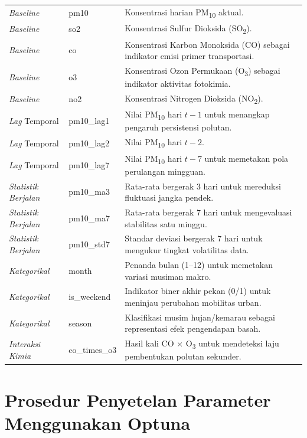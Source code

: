 \begin{longtable}{>{\raggedright\arraybackslash}p{2.5cm}
                  >{\raggedright\arraybackslash}p{2.3cm}
                  >{\raggedright\arraybackslash}p{8.1cm}}
\textit{Baseline} & pm10 & Konsentrasi harian PM\textsubscript{10} aktual. \\
\textit{Baseline} & so2 & Konsentrasi Sulfur Dioksida (SO\textsubscript{2}). \\
\textit{Baseline} & co & Konsentrasi Karbon Monoksida (CO) sebagai indikator emisi primer transportasi. \\
\textit{Baseline} & o3 & Konsentrasi Ozon Permukaan (O\textsubscript{3}) sebagai indikator aktivitas fotokimia. \\
\textit{Baseline} & no2 & Konsentrasi Nitrogen Dioksida (NO\textsubscript{2}). \\
\textit{Lag} Temporal & pm10\_lag1 & Nilai PM\textsubscript{10} hari $t-1$ untuk menangkap pengaruh persistensi polutan. \\
\textit{Lag} Temporal & pm10\_lag2 & Nilai PM\textsubscript{10} hari $t-2$. \\
\textit{Lag} Temporal & pm10\_lag7 & Nilai PM\textsubscript{10} hari $t-7$ untuk memetakan pola perulangan mingguan. \\
\textit{Statistik Berjalan} & pm10\_ma3 & Rata-rata bergerak 3 hari untuk mereduksi fluktuasi jangka pendek. \\
\textit{Statistik Berjalan} & pm10\_ma7 & Rata-rata bergerak 7 hari untuk mengevaluasi stabilitas satu minggu. \\
\textit{Statistik Berjalan} & pm10\_std7 & Standar deviasi bergerak 7 hari untuk mengukur tingkat volatilitas data. \\
\textit{Kategorikal} & month & Penanda bulan (1--12) untuk memetakan variasi musiman makro. \\
\textit{Kategorikal} & is\_weekend & Indikator biner akhir pekan (0/1) untuk meninjau perubahan mobilitas urban. \\
\textit{Kategorikal} & season & Klasifikasi musim hujan/kemarau sebagai representasi efek pengendapan basah. \\
\textit{Interaksi Kimia} & co\_times\_o3 & Hasil kali CO $\times$ O\textsubscript{3} untuk mendeteksi laju pembentukan polutan sekunder. \\
\end{longtable}

\raggedbottom

\section{Prosedur Penyetelan Parameter Menggunakan Optuna}

